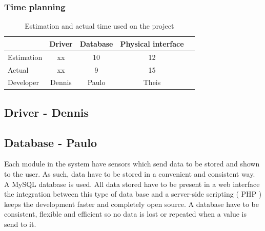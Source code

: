 \subsubsection{Time planning}
\begin{table}[H]
\centering
	\begin{tabular}{|l|c|c|c|c|}
		\hline
		~			& Driver		& Database	& Physical interface\\ \hline
		Estimation	& xx			& 10		& 12				\\
		Actual		& xx			& 9			& 15				\\
		Developer	& Dennis		& Paulo		& Theis				\\
		\hline
	\end{tabular}
	\caption{Estimation and actual time used on the project}
\end{table}
\subsection{Driver - Dennis}
%			
%					
%	
%	
%	
%	
%	
%	
%	
\subsection{Database - Paulo}

Each module in the system have sensors which send data to be stored and shown to the user. As such, data have to be stored in a convenient and consistent way. A MySQL database is used. All data stored have to be present in a web interface the integration between this type of data base and a server-side scripting ( PHP ) keeps the development faster and completely open source.
A database have to be consistent, flexible and efficient so no data is lost or repeated when a value is send to it.
%
